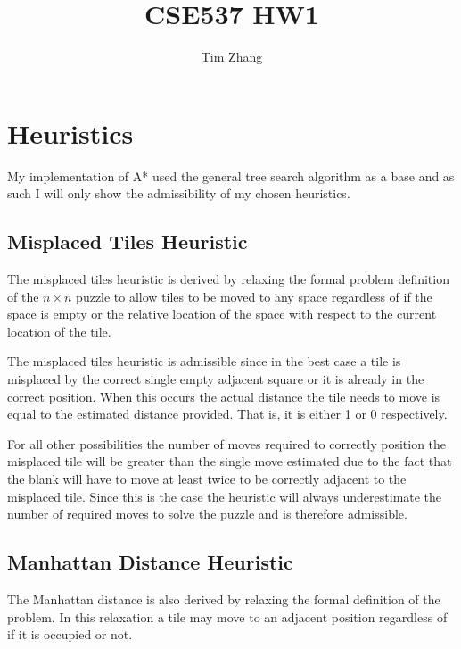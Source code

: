 \documentclass[11pt, oneside]{article}   	%
\title{CSE537 HW1}
\author{Tim Zhang}
\begin{document}
\maketitle

\section{Heuristics}
My implementation of A* used the general tree search algorithm as a base and as such I will only show the admissibility of my chosen heuristics.

\subsection{Misplaced Tiles Heuristic}
The misplaced tiles heuristic is derived by relaxing the formal problem definition of the $n \times n$ puzzle to allow tiles to be moved to any space regardless of if the space is empty or the relative location of the space with respect to the current location of the tile.

The misplaced tiles heuristic is admissible since in the best case a tile is misplaced by the correct single empty adjacent square or it is already in the correct position.  When this occurs the actual distance the tile needs to move is equal to the estimated distance provided.  That is, it is either 1 or 0 respectively.  

For all other possibilities the number of moves required to correctly position the misplaced tile will be greater than the single move estimated due to the fact that the blank will have to move at least twice to be correctly adjacent to the misplaced tile.  Since this is the case the heuristic will always underestimate the number of required moves to solve the puzzle and is therefore admissible.

\subsection{Manhattan Distance Heuristic}
The Manhattan distance is also derived by relaxing the formal definition of the problem.  In this relaxation a tile may move to an adjacent position regardless of if it is occupied or not.
\end{document}
